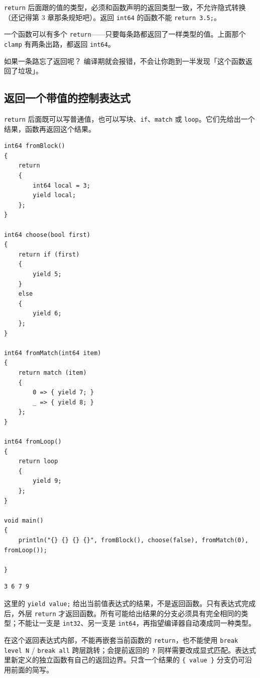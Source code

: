 \texttt{return} 后面跟的值的类型，必须和函数声明的返回类型一致，不允许隐式转换（还记得第 3 章那条规矩吧）。返回 \texttt{int64} 的函数不能 \texttt{return 3.\allowbreak{}5;}。

一个函数可以有多个 \texttt{return}——只要每条路都返回了一样类型的值。上面那个 \texttt{clamp} 有两条出路，都返回 \texttt{int64}。

如果一条路忘了返回呢？ 编译期就会报错，不会让你跑到一半发现「这个函数返回了垃圾」。

\subsection*{返回一个带值的控制表达式}

\texttt{return} 后面既可以写普通值，也可以写块、\texttt{if}、\texttt{match} 或 \texttt{loop}。它们先给出一个结果，函数再返回这个结果。

\par
\medskip
\begin{lstlisting}[style=chali]
int64 fromBlock()
{
    return
    {
        int64 local = 3;
        yield local;
    };
}

int64 choose(bool first)
{
    return if (first)
    {
        yield 5;
    }
    else
    {
        yield 6;
    };
}

int64 fromMatch(int64 item)
{
    return match (item)
    {
        0 => { yield 7; }
        _ => { yield 8; }
    };
}

int64 fromLoop()
{
    return loop
    {
        yield 9;
    };
}

void main()
{
    println("{} {} {} {}", fromBlock(), choose(false), fromMatch(0), fromLoop());

}
\end{lstlisting}
\par
\medskip

\par
\medskip
\begin{lstlisting}[style=out]
3 6 7 9
\end{lstlisting}
\par
\medskip

这里的 \texttt{yield value;} 给出当前值表达式的结果，不是返回函数。只有表达式完成后，外层 \texttt{return} 才返回函数。所有可能给出结果的分支必须具有完全相同的类型；不能让一支是 \texttt{int32}、另一支是 \texttt{int64}，再指望编译器自动凑成同一种类型。

在这个返回表达式内部，不能再嵌套当前函数的 \texttt{return}，也不能使用 \texttt{break level N} / \texttt{break all} 跨层跳转；会提前返回的 \texttt{?} 同样需要改成显式匹配。表达式里新定义的独立函数有自己的返回边界。只含一个结果的 \texttt{\{ value \}} 分支仍可沿用前面的简写。

